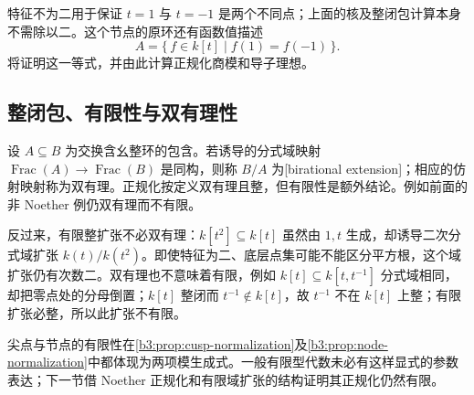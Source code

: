 特征不为二用于保证 \(t=1\) 与 \(t=-1\) 是两个不同点；上面的核及整闭包计算本身不需除以二。这个节点的原环还有函数值描述
\[
	A=\bigl\{\,f\in k[t]\mid f(1)=f(-1)\,\bigr\}.
\]
将证明这一等式，并由此计算正规化商模和导子理想。

\subsection{整闭包、有限性与双有理性}\label{b3:subsec:0604:04}

设 \(A\subseteq B\) 为交换含幺整环的包含。若诱导的分式域映射 \(\operatorname{Frac}(A)\to\operatorname{Frac}(B)\) 是同构，则称 \(B/A\) 为[birational extension]；相应的仿射映射称为双有理。正规化按定义双有理且整，但有限性是额外结论。例如前面的非 Noether 例仍双有理而不有限。

\ProseParagraphBreak
反过来，有限整扩张不必双有理：\(k[t^2]\subseteq k[t]\) 虽然由 \(1,t\) 生成，却诱导二次分式域扩张 \(k(t)/k(t^2)\)。即使特征为二、底层点集可能不能区分平方根，这个域扩张仍有次数二。双有理也不意味着有限，例如 \(k[t]\subseteq k[t,t^{-1}]\) 分式域相同，却把零点处的分母倒置；\(k[t]\) 整闭而 \(t^{-1}\notin k[t]\)，故 \(t^{-1}\) 不在 \(k[t]\) 上整；有限扩张必整，所以此扩张不有限。

\ProseParagraphBreak
尖点与节点的有限性在\cref{b3:prop:cusp-normalization}及\cref{b3:prop:node-normalization}中都体现为两项模生成式。一般有限型代数未必有这样显式的参数表达；下一节借 Noether 正规化和有限域扩张的结构证明其正规化仍然有限。
